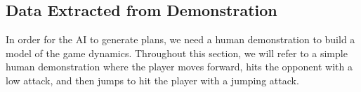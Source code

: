 







\subsection{Data Extracted from Demonstration}

In order for the AI to generate plans, we need a human demonstration to build a model of the game dynamics. Throughout this section, we will refer to a simple human demonstration where the player moves forward, hits the opponent with a low attack, and then jumps to hit the player with a jumping attack.

